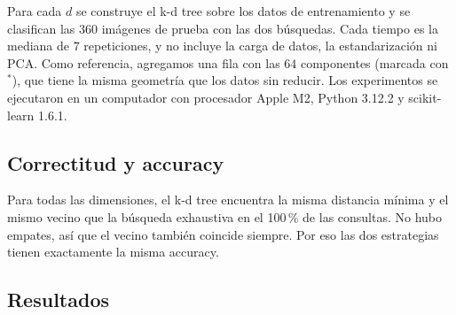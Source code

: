 Para cada $d$ se construye el k-d tree sobre los datos de entrenamiento y se clasifican las
$360$ imágenes de prueba con las dos búsquedas. Cada tiempo es la mediana de $7$
repeticiones, y no incluye la carga de datos, la estandarización ni PCA. Como referencia,
agregamos una fila con las $64$ componentes (marcada con $^{*}$), que tiene la misma
geometría que los datos sin reducir. Los experimentos se ejecutaron en un computador con
procesador Apple M2, Python 3.12.2 y scikit-learn 1.6.1.

\subsection{Correctitud y accuracy}

\begin{table}[H]
  \centering
  \caption{Validación del k-d tree con la búsqueda exhaustiva como referencia, y accuracy
  1-NN en el conjunto de prueba.}
  \small
  
\end{table}

Para todas las dimensiones, el k-d tree encuentra la misma distancia mínima y el mismo
vecino que la búsqueda exhaustiva en el 100\,\% de las consultas. No hubo empates, así
que el vecino también coincide siempre. Por eso las dos estrategias tienen exactamente la
misma accuracy.

\subsection{Resultados}

\begin{table}[H]
  \centering
  \caption{Tiempos (mediana de 7 repeticiones) y speedup de consulta
  $S = T_{\text{exhaustiva}} / T_{\text{k-d tree}}$.}
  \resizebox{\linewidth}{!}{}
\end{table}

\begin{table}[H]
  \centering
  \caption{Trabajo por consulta: nodos visitados por el k-d tree, fracción del conjunto de
  entrenamiento ($n_{\text{train}} = 1437$) y distancias evaluadas en total por cada
  método para las $360$ consultas.}
  \resizebox{\linewidth}{!}{}
\end{table}

